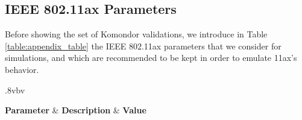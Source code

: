 \documentclass[a4paper]{article}
\begin{document}
	\subsection{IEEE 802.11ax Parameters}
	\label{section:parameters}
	Before showing the set of Komondor validations, we introduce in Table \ref{table:appendix_table} the IEEE 802.11ax parameters that we consider for simulations, and which are recommended to be kept in order to emulate 11ax's behavior.	
	
	\begin{table}[h]
		\caption{Parameters considered in the IEEE 802.11ax scenarios.}
		\label{table:appendix_table}
		\centering
		\begin{tabularx}{.8\textwidth}{vbv}
			\toprule
			
			\textbf{Parameter}     & \textbf{Description}              & \textbf{Value} \\ 
			
			\midrule
			

\end{tabularx}
\end{table}
\end{document}
